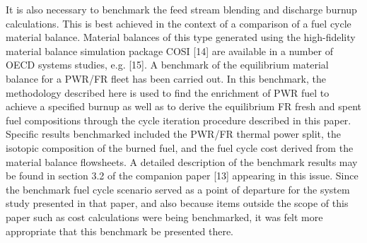 It is also necessary to benchmark the feed stream blending and discharge burnup calculations.  This is best achieved in the context of a comparison of a fuel cycle material balance.  Material balances of this type generated using the high-fidelity material balance simulation package COSI [14] are available in a number of OECD systems studies, e.g. [15].  A benchmark of the equilibrium material balance for a PWR/FR fleet has been carried out.  In this benchmark, the methodology described here is used to find the enrichment of PWR fuel to achieve a specified burnup as well as to derive the equilibrium FR fresh and spent fuel compositions through the cycle iteration procedure described in this paper.  Specific results benchmarked included the PWR/FR thermal power split, the isotopic composition of the burned fuel, and the fuel cycle cost derived from the material balance flowsheets.  A detailed description of the benchmark results may be found in section 3.2 of the companion paper [13] appearing in this issue.  Since the benchmark fuel cycle scenario served as a point of departure for the system study presented in that paper, and also because items outside the scope of this paper such as cost calculations were being benchmarked, it was felt more appropriate that this benchmark be presented there.





